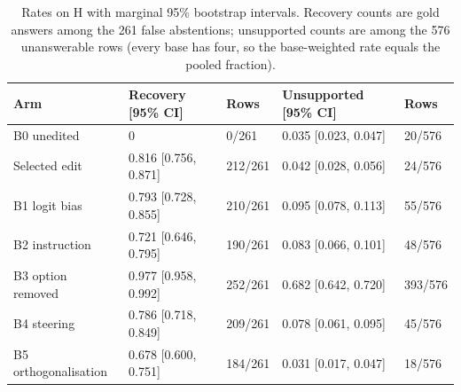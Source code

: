 \begin{table}[ht]
\centering\small
\caption{Rates on H with marginal 95\% bootstrap intervals. Recovery counts are gold answers among the 261 false
abstentions; unsupported counts are among the 576 unanswerable rows (every base has four, so the base-weighted rate
equals the pooled fraction).}
\label{tab:figdata}
\begin{tabular}{@{}lllll@{}}
\toprule
Arm & Recovery [95\% CI] & Rows & Unsupported [95\% CI] & Rows \\
\midrule
B0 unedited & 0 & 0/261 & 0.035 [0.023, 0.047] & 20/576 \\
Selected edit & 0.816 [0.756, 0.871] & 212/261 & 0.042 [0.028, 0.056] & 24/576 \\
B1 logit bias & 0.793 [0.728, 0.855] & 210/261 & 0.095 [0.078, 0.113] & 55/576 \\
B2 instruction & 0.721 [0.646, 0.795] & 190/261 & 0.083 [0.066, 0.101] & 48/576 \\
B3 option removed & 0.977 [0.958, 0.992] & 252/261 & 0.682 [0.642, 0.720] & 393/576 \\
B4 steering & 0.786 [0.718, 0.849] & 209/261 & 0.078 [0.061, 0.095] & 45/576 \\
B5 orthogonalisation & 0.678 [0.600, 0.751] & 184/261 & 0.031 [0.017, 0.047] & 18/576 \\
\bottomrule
\end{tabular}
\end{table}
